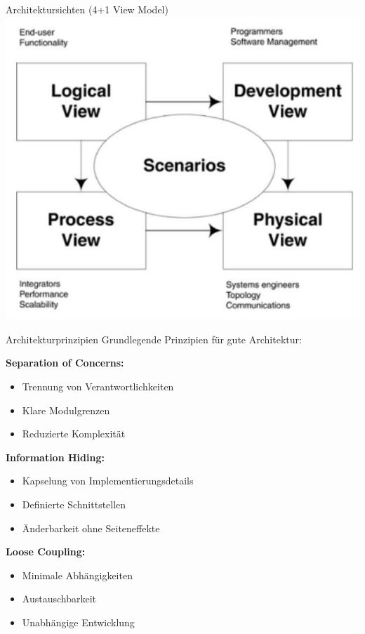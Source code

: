 \begin{concept}{Architektursichten (4+1 View Model)}
\includegraphics[width=0.9\linewidth]{images/2024_12_29_0d1d7b5551ea1b4b41bdg-09}
\end{concept}

\begin{concept}{Architekturprinzipien}
Grundlegende Prinzipien für gute Architektur:

\textbf{Separation of Concerns:}
\begin{itemize}
    \item Trennung von Verantwortlichkeiten
    \item Klare Modulgrenzen
    \item Reduzierte Komplexität
\end{itemize}

\textbf{Information Hiding:}
\begin{itemize}
    \item Kapselung von Implementierungsdetails
    \item Definierte Schnittstellen
    \item Änderbarkeit ohne Seiteneffekte
\end{itemize}

\textbf{Loose Coupling:}
\begin{itemize}
    \item Minimale Abhängigkeiten
    \item Austauschbarkeit
    \item Unabhängige Entwicklung
\end{itemize}
\end{concept}


